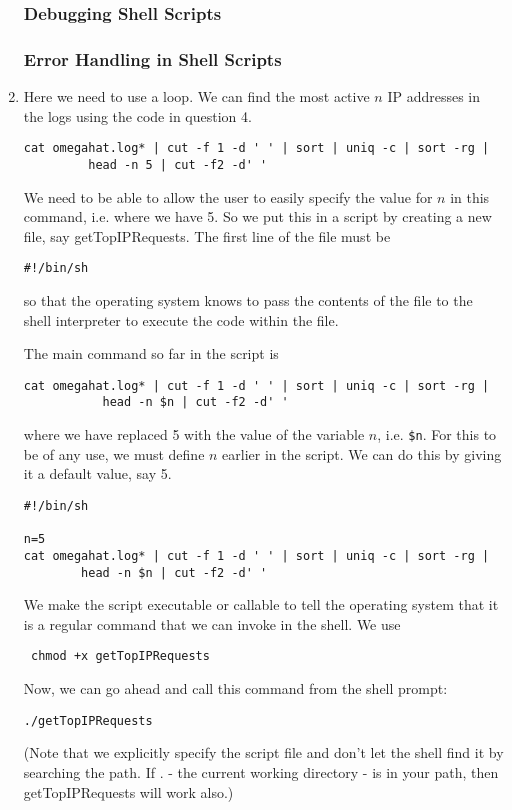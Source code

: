 \begin{enumerate}
\subsubsection{Debugging Shell Scripts}

\subsubsection{Error Handling in Shell Scripts}

\item
Here we need to use a loop.
We can find the most active $n$ IP addresses in the logs using
the code in question 4.
\begin{verbatim}
cat omegahat.log* | cut -f 1 -d ' ' | sort | uniq -c | sort -rg | 
         head -n 5 | cut -f2 -d' '
\end{verbatim}
We need to be able to allow the user to easily specify the value for
$n$
in this command, i.e. where we have 5. So we put this in a script
by creating a new file, say getTopIPRequests.
The first line of the file must be
\begin{verbatim}
#!/bin/sh
\end{verbatim}
so that the operating system knows to pass the contents of the file
to the shell interpreter to execute the code within the file.

The main command so far in the script is
\begin{verbatim}
cat omegahat.log* | cut -f 1 -d ' ' | sort | uniq -c | sort -rg |
           head -n $n | cut -f2 -d' '
\end{verbatim}
where we have replaced 5 with the value of the variable $n$,
i.e. \verb+$n+.
For this to be of any use, we must define $n$ earlier in the script.
We can do this by giving it a default value, say 5.
\begin{verbatim}
#!/bin/sh

n=5
cat omegahat.log* | cut -f 1 -d ' ' | sort | uniq -c | sort -rg | 
        head -n $n | cut -f2 -d' '
\end{verbatim}

We make the script executable or callable to tell the operating system
that it is a regular command that we can invoke in the shell.
We use 
\begin{verbatim}
 chmod +x getTopIPRequests
\end{verbatim}

Now, we can go ahead and call this command from the shell prompt:
\begin{verbatim}
./getTopIPRequests
\end{verbatim}
(Note that we explicitly specify the script file and don't let the
shell find it by searching the path. If . - the current working
directory - is in your path, then getTopIPRequests will work also.)


\end{enumerate}
